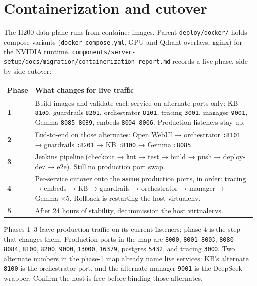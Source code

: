 \section{Containerization and cutover}\label{containerization-and-cutover}

The H200 data plane runs from container images. Parent \texttt{deploy/docker/} holds compose variants (\texttt{docker-compose.yml}, GPU and Qdrant overlays, nginx) for the NVIDIA runtime. \texttt{components/server-setup/docs/migration/containerization-report.md} records a five-phase, side-by-side cutover:

\begin{longtable}[]{@{}
  >{\raggedright\arraybackslash}p{}
  >{\raggedright\arraybackslash}p{}@{}}
\toprule\noalign{}
Phase & What changes for live traffic \\
\midrule\noalign{}
\endhead
\bottomrule\noalign{}
\endlastfoot
\textbf{1} & Build images and validate each service on alternate ports only: KB \texttt{8100}, guardrails \texttt{8201}, orchestrator \texttt{8101}, tracing \texttt{3001}, manager \texttt{9001}, Gemma \texttt{8085–8089}, embeds \texttt{8004–8006}. Production listeners stay up. \\
\textbf{2} & End-to-end on those alternates: Open WebUI → orchestrator \texttt{:8101} → guardrails \texttt{:8201} → KB \texttt{:8100} → Gemma \texttt{:8085}. \\
\textbf{3} & Jenkins pipeline (checkout → lint → test → build → push → deploy-dev → e2e). Still no production port swap. \\
\textbf{4} & Per-service cutover onto the \textbf{same} production ports, in order: tracing → embeds → KB → guardrails → orchestrator → manager → Gemma ×5. Rollback is restarting the host virtualenv. \\
\textbf{5} & After 24 hours of stability, decommission the host virtualenvs. \\
\end{longtable}

Phases 1--3 leave production traffic on its current listeners; phase 4 is the step that changes them. Production ports in the map are \texttt{8000}, \texttt{8001–8003}, \texttt{8080–8084}, \texttt{8100}, \texttt{8200}, \texttt{9000}, \texttt{13000}, \texttt{16379}, postgres \texttt{5432}, and tracing \texttt{3000}. Two alternate numbers in the phase-1 map already name live services: KB's alternate \texttt{8100} is the orchestrator port, and the alternate manager \texttt{9001} is the DeepSeek wrapper. Confirm the host is free before binding those alternates.


